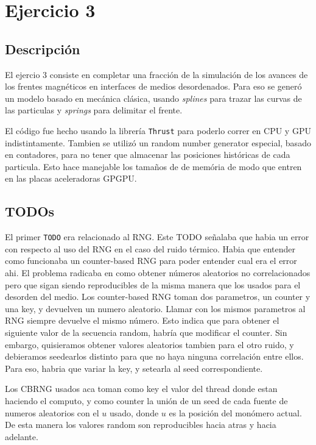 \section{Ejercicio 3}

\subsection{Descripci\'on}
El ejercio 3 consiste en completar una fracci\'on de la simulaci\'on de los avances de los frentes magn\'eticos
en interfaces de medios desordenados. Para eso se gener\'o un modelo basado en mec\'anica cl\'asica, usando
\textit{splines} para trazar las curvas de las particulas y \textit{springs} para delimitar el frente.

El c\'odigo fue hecho usando la librer\'ia \texttt{Thrust} para poderlo correr en CPU y GPU indistintamente.
Tambien se utiliz\'o un random number generator especial, basado en contadores, para no tener que almacenar las posiciones 
hist\'oricas de cada particula. Esto hace manejable los tama\~nos de de mem\'oria de modo que entren en las placas
aceleradoras GPGPU. 

\subsection{TODOs}
El primer \texttt{TODO} era relacionado al RNG. Este TODO se\~nalaba que habia un error con respecto al
uso del RNG en el caso del ruido t\'ermico. Habia que entender como funcionaba un counter-based RNG para
poder entender cual era el error ahi. El problema radicaba en como obtener n\'umeros aleatorios no correlacionados
pero que sigan siendo reproducibles de la misma manera que los usados para el desorden del medio. 
Los counter-based RNG toman dos parametros, un counter y una key, y devuelven un numero aleatorio. Llamar
con los mismos parametros al RNG siempre devuelve el mismo n\'umero. Esto indica que para obtener 
el siguiente valor de la secuencia random, habr\'ia que modificar el counter. Sin embargo, quisieramos
obtener valores aleatorios tambien para el otro ruido, y debieramos seedearlos distinto para que no
haya ninguna correlaci\'on entre ellos. Para eso, habria que variar la key, y setearla al seed correspondiente.

Los CBRNG usados aca toman como key el valor del thread donde estan haciendo el computo, y como counter 
la uni\'on de un seed de cada fuente de numeros aleatorios con el $u$ usado, donde $u$ es la posici\'on del mon\'omero
actual. De esta manera los valores random son reproducibles hacia atras y hacia adelante.

